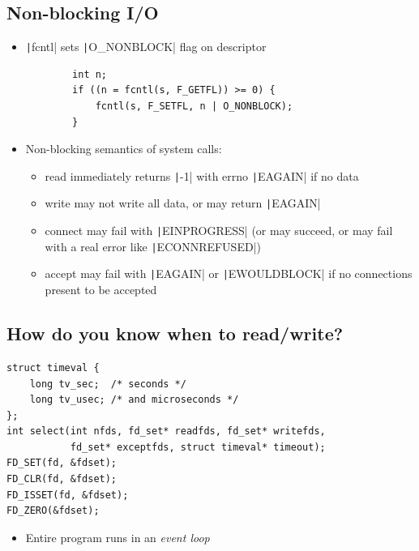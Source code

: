 {\subsection{Non-blocking I/O}
\begin{itemize}[nosep]
    \item \texttt|fcntl| sets \texttt|O_NONBLOCK| flag on descriptor
          \begin{verbatim}
        int n;
        if ((n = fcntl(s, F_GETFL)) >= 0) {
            fcntl(s, F_SETFL, n | O_NONBLOCK);
        }
    \end{verbatim}
    \item Non-blocking semantics of system calls:
          \begin{itemize}[nosep]
              \item read immediately returns \texttt|-1| with errno \texttt|EAGAIN| if no data
              \item write may not write all data, or may return \texttt|EAGAIN|
              \item connect may fail with \texttt|EINPROGRESS| (or may succeed, or may fail with a real error like \texttt|ECONNREFUSED|)
              \item accept may fail with \texttt|EAGAIN| or \texttt|EWOULDBLOCK| if no connections present to be accepted
          \end{itemize}
\end{itemize}
\subsection{How do you know when to read/write?}
\begin{verbatim}
struct timeval {
    long tv_sec;  /* seconds */
    long tv_usec; /* and microseconds */
};
int select(int nfds, fd_set* readfds, fd_set* writefds,
           fd_set* exceptfds, struct timeval* timeout);
FD_SET(fd, &fdset);
FD_CLR(fd, &fdset);
FD_ISSET(fd, &fdset);
FD_ZERO(&fdset);
\end{verbatim}
\begin{itemize}\item Entire program runs in an \emph{event loop}\end{itemize}
}
